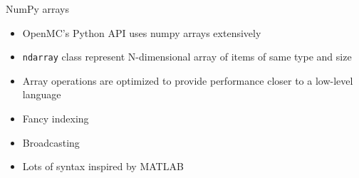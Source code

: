 \documentclass[noamssymb,svgnames]{beamer}
\newcommand{\obj}[1]{\texttt{\color{darkblue}#1}}
\begin{document}
\begin{frame}{NumPy arrays}
  \begin{itemize}
  \item OpenMC's Python API uses numpy arrays extensively
  \item \obj{ndarray} class represent N-dimensional array of items of same
    type and size
  \item Array operations are optimized to provide performance closer to a
    low-level language
  \item Fancy indexing
  \item Broadcasting
  \item Lots of syntax inspired by MATLAB
  \end{itemize}
\end{frame}
\end{document}
